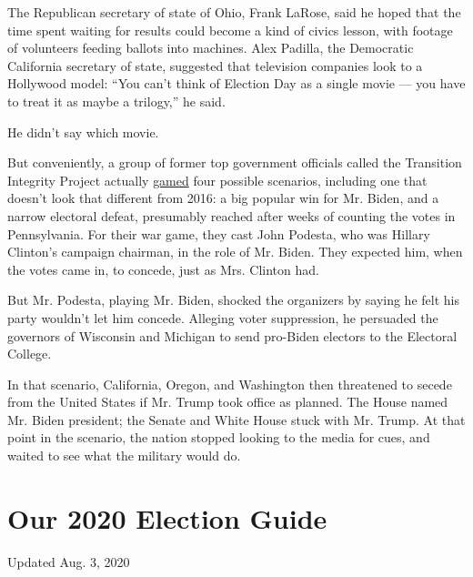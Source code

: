 The Republican secretary of state of Ohio, Frank LaRose, said he hoped
that the time spent waiting for results could become a kind of civics
lesson, with footage of volunteers feeding ballots into machines. Alex
Padilla, the Democratic California secretary of state, suggested that
television companies look to a Hollywood model: ``You can't think of
Election Day as a single movie --- you have to treat it as maybe a
trilogy,'' he said.

He didn't say which movie.

But conveniently, a group of former top government officials called the
Transition Integrity Project actually
\href{https://www.bostonglobe.com/2020/07/25/nation/bipartisan-group-secretly-gathered-game-out-contested-trump-biden-election-it-wasnt-pretty/}{gamed}
four possible scenarios, including one that doesn't look that different
from 2016: a big popular win for Mr. Biden, and a narrow electoral
defeat, presumably reached after weeks of counting the votes in
Pennsylvania. For their war game, they cast John Podesta, who was
Hillary Clinton's campaign chairman, in the role of Mr. Biden. They
expected him, when the votes came in, to concede, just as Mrs. Clinton
had.

But Mr. Podesta, playing Mr. Biden, shocked the organizers by saying he
felt his party wouldn't let him concede. Alleging voter suppression, he
persuaded the governors of Wisconsin and Michigan to send pro-Biden
electors to the Electoral College.

In that scenario, California, Oregon, and Washington then threatened to
secede from the United States if Mr. Trump took office as planned. The
House named Mr. Biden president; the Senate and White House stuck with
Mr. Trump. At that point in the scenario, the nation stopped looking to
the media for cues, and waited to see what the military would do.

\hypertarget{our-2020-election-guide}{%
\section{Our 2020 Election Guide}\label{our-2020-election-guide}}

Updated Aug. 3, 2020

